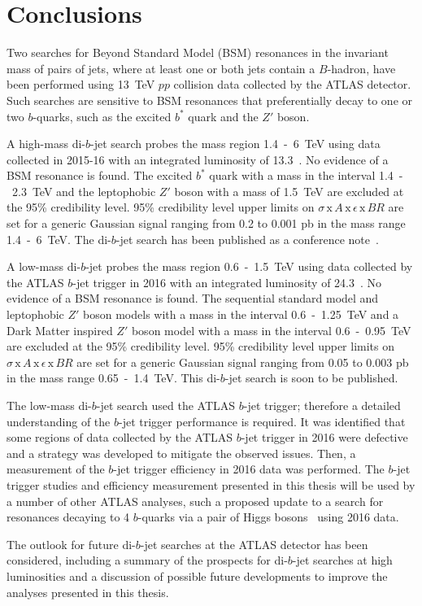 \chapter{Conclusions}
\label{sec:conc}

Two searches for Beyond Standard Model (BSM) resonances in the invariant mass of pairs of jets,
where at least one or both jets contain a $B$-hadron,
have been performed using 13~TeV $pp$ collision data collected by the ATLAS detector.
Such searches are sensitive to BSM resonances that preferentially decay to one or two $b$-quarks, such as the excited $b^*$ quark and the $Z'$ boson.


A high-mass di-$b$-jet search probes the mass region 1.4~-~6~TeV
using data collected in 2015-16 with an integrated luminosity of 13.3~\ifb{}.
No evidence of a BSM resonance is found.
The excited $b^*$ quark with a mass in the interval 1.4~-~2.3~TeV
and the leptophobic $Z'$ boson with a mass of 1.5~TeV are excluded at the 95\% credibility level.
95\% credibility level upper limits on $\sigma\,\text{x}\,\mathit{A}\,\text{x}\,\epsilon\,\text{x}\,\mathit{BR}$
are set for a generic Gaussian signal ranging from 0.2 to 0.001 pb in the mass range 1.4~-~6~TeV.
The di-$b$-jet search has been published as a conference note~\cite{dibjet-ichep_conf}.

A low-mass di-$b$-jet probes the mass region 0.6~-~1.5~TeV
using data collected by the ATLAS $b$-jet trigger in 2016 with an integrated luminosity of 24.3~\ifb{}.
No evidence of a BSM resonance is found.
The sequential standard model and leptophobic $Z'$  boson models with a mass in the interval 0.6~-~1.25~TeV
and a Dark Matter inspired $Z'$ boson model with a mass in the interval 0.6~-~0.95~TeV are excluded at the 95\% credibility level.
95\% credibility level upper limits on $\sigma\,\text{x}\,\mathit{A}\,\text{x}\,\epsilon\,\text{x}\,\mathit{BR}$
are set for a generic Gaussian signal ranging from 0.05 to 0.003 pb in the mass range 0.65~-~1.4~TeV.
This di-$b$-jet search is soon to be published.

The low-mass di-$b$-jet search used the ATLAS $b$-jet trigger; therefore a detailed understanding of the $b$-jet trigger performance is required.
It was identified that some regions of data collected by the ATLAS $b$-jet trigger in 2016 were defective
and a strategy was developed to mitigate the observed issues.
Then, a measurement of the $b$-jet trigger efficiency in 2016 data was performed.
The $b$-jet trigger studies and efficiency measurement presented in this thesis will be used by a number of other ATLAS analyses,
such a proposed update to a search for resonances decaying to 4 $b$-quarks via a pair of Higgs bosons~\cite{trig-H4b} using 2016 data.

The outlook for future di-$b$-jet searches at the ATLAS detector has been considered,
including a summary of the prospects for di-$b$-jet searches at high luminosities
and a discussion of possible future developments to improve the analyses presented in this thesis.

